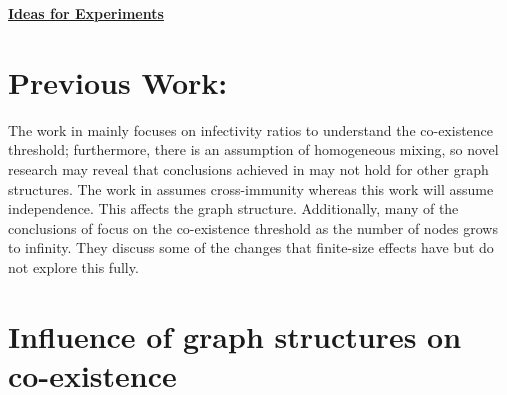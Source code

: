 \documentclass[11pt]{article}
\begin{document}
\newtheorem{theorem}{Theorem}[section]
\newtheorem{lemma}{Lemma}[section]
\newtheorem{corollary}{Corollary}[section]
\newtheorem{fact}{Fact}[section]
\newtheorem{definition}{Definition}[section]
\newtheorem{proposition}{Proposition}[section]
\newtheorem{observation}{Observation}[section]
\newtheorem{claim}{Claim}[section]

\newcommand{\cnp}{\textbf{NP}}
\newcommand{\true}{\texttt{True}}
\newcommand{\false}{\texttt{False}}

\newcommand{\QED}{\hfill\rule{2mm}{2mm}}

\newcommand{\irange}{\mbox{$1 \leq i \leq n$}}
\newcommand{\jrange}{\mbox{$1 \leq j \leq m$}}

\newcommand{\dunder}[1]{\underline{\underline{#1}}}

\setlength{\parskip}{3pt}

\normalbaselineskip

\newcommand{\cone}{\mbox{$\mathcal{C}_1$}}
\newcommand{\ctwo}{\mbox{$\mathcal{C}_2$}}


\newcommand{\sstate}{\mbox{$\mathbb{S}$}}
\newcommand{\istate}{\mbox{$\mathbb{I}$}}
\newcommand{\rstate}{\mbox{$\mathbb{R}$}}

\begin{center}
\dunder{\Large{\textbf{Ideas for Experiments}}}
\end{center}


\medskip

\section{Previous Work:}
The work in \cite{10.1145/2339530.2339601} mainly focuses on infectivity ratios to understand the co-existence threshold; furthermore, there is an assumption of homogeneous mixing, so novel research may reveal that conclusions achieved in \cite{10.1145/2339530.2339601} may not hold for other graph structures. The work in \cite{Karrer_2011} assumes cross-immunity whereas this work will assume independence. This affects the graph structure. Additionally, many of the conclusions of \cite{Karrer_2011} focus on the co-existence threshold as the number of nodes grows to infinity. They discuss some of the changes that finite-size effects have but do not explore this fully.

\section{Influence of graph structures on co-existence} 
\end{document}
